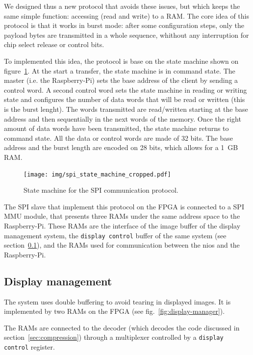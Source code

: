 \documentclass[english, DIV=13]{scrartcl}
\begin{document}
We designed thus a new protocol that avoids these issues, but which keeps the same simple
function: accessing (read and write) to a RAM.
The core idea of this protocol is that it works in burst mode: after some configuration steps,
only the payload bytes are transmitted in a whole sequence, whithout any interruption for
chip select release or control bits.

To implemented this idea, the protocol is base on the state machine shown on figure~\ref{fig:spi}.
At the start a transfer, the state machine is in command state.
The master (i.e. the Raspberry-Pi) sets the base address of the client by
sending a control word. A second control word sets the state machine in reading or writing state
and configures the number of data words that will be read or written (this is the burst lenght).
The words transmitted are read/written starting at the base address and then sequentially in the
next words of the memory.
Once the right amount of data words have been transmitted, the state machine returns to command state.
All the data or control words are made of 32 bits. The base address and the burst length are encoded
on 28 bits, which allows for a \SI{1}{GB} RAM.

\begin{figure}
    \centering
    \texttt{[image: img/spi\_state\_machine\_cropped.pdf]}
    \caption{State machine for the SPI communication protocol.}
    \label{fig:spi}
\end{figure}

The SPI slave that implement this protocol on the FPGA is connected to a SPI MMU module, that presents
three RAMs under the same address space to the Raspberry-Pi.
These RAMs are the interface of the image buffer of the display management system, the \texttt{display control}
buffer of the same system (see section~\ref{sec:display-mngt}), and the RAMs used for communication between the nios
and the Raspberry-Pi.

\subsection{Display management}
\label{sec:display-mngt}

The system uses double buffering to avoid tearing in displayed images.
It is implemented by two RAMs on the FPGA (see fig.~\ref{fig:display-manager}).

The RAMs are connected to the decoder
(which decodes the code discussed in section~\ref{sec:compression})
through a multiplexer controlled by a \texttt{display control} register.
\end{document}
